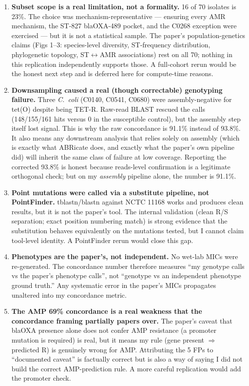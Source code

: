 \documentclass[11pt,a4paper]{article}
\begin{document}
\begin{enumerate}[leftmargin=1.4em,itemsep=0.35em]
  \item \textbf{Subset scope is a real limitation, not a formality.} 16 of 70 isolates is 23\%. The choice was mechanism-representative --- ensuring every AMR mechanism, the ST-827 blaOXA-489 pocket, and the C0268 exception were exercised --- but it is not a statistical sample. The paper's population-genetics claims (Figs 1--3: species-level diversity, ST-frequency distribution, phylogenetic topology, ST$\leftrightarrow$AMR associations) rest on all 70; nothing in this replication independently supports those. A full-cohort rerun would be the honest next step and is deferred here for compute-time reasons.
  \item \textbf{Downsampling caused a real (though correctable) genotyping failure.} Three \textit{C.\ coli} (C0140, C0541, C0680) were assembly-negative for tet(O) despite being TET-R. Raw-read BLAST rescued the calls (148/155/161 hits versus 0 in the susceptible control), but the assembly step itself lost signal. This is why the raw concordance is 91.1\% instead of 93.8\%. It also means any downstream analysis that relies solely on assembly (which is exactly what ABRicate does, and exactly what the paper's own pipeline did) will inherit the same class of failure at low coverage. Reporting the corrected 93.8\% is honest because reads-level confirmation is a legitimate orthogonal check; but on my \emph{assembly} pipeline alone, the number is 91.1\%.
  \item \textbf{Point mutations were called via a substitute pipeline, not PointFinder.} tblastn/blastn against NCTC 11168 works and produces clean results, but it is not the paper's tool. The internal validation (clean R/S separation; exact position numbering match) is strong evidence that the substitution behaves equivalently on the mutations tested, but I cannot claim tool-level identity. A PointFinder rerun would close this gap.
  \item \textbf{Phenotypes are the paper's, not independent.} No wet-lab MICs were re-generated. The concordance number therefore measures ``my genotype calls vs the paper's phenotype calls'', not ``genotype vs an independent phenotype ground truth.'' Any systematic error in the paper's MICs propagates unaltered into my concordance metric.
  \item \textbf{The AMP 69\% concordance is a real weakness that the concordance framing partially papers over.} The paper's caveat that blaOXA presence alone does not confer AMP resistance (a promoter mutation is required) is real, but it means my rule (gene present $\Rightarrow$ predicted R) is genuinely wrong for AMP. Attributing the 5 FPs to ``documented caveat'' is factually correct but is also a way of saying I did not build the correct AMP-prediction rule. A more careful replication would add the promoter check.

\end{enumerate}
\end{document}
